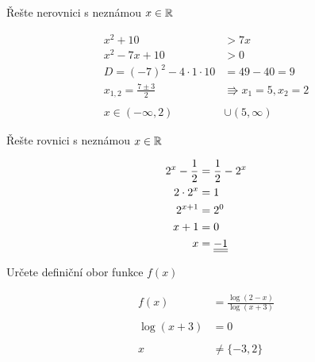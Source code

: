 \begin{example}
    Řešte nerovnici s neznámou $x \in \mathbb{R}$
\end{example}
\begin{align*}
    x^2+10 &> 7x
    \\
    x^2 -7x + 10 &> 0 \\
    D = (-7)^2 - 4\cdot1\cdot10 &= 49-40 = 9 \\
    x_{1,2} = \frac{7 \pm 3}{2} &\Rrightarrow x_1 = 5, x_2 = 2 \\\\
    x \in (-\infty, 2) &\cup (5, \infty) 
\end{align*}
\begin{example}
    Řešte rovnici s neznámou $x \in \mathbb{R}$
\end{example}
\begin{align*}
    2^x - \frac{1}{2} &= \frac{1}{2} - 2^x
    \\ 2 \cdot 2^x &= 1
    \\ 2^{x+1} &= 2^0
    \\ x+1 &= 0 
    \\ x &= \underline{\underline{-1}} 
\end{align*}
\begin{example}
    Určete definiční obor funkce $f(x)$
\end{example}
\begin{align*}
    f(x) &= \frac{\log{(2-x)}}{\log{(x+3)}}
    \\ \\ \log{(x+3)} &= 0  
    \\ \\ x &\neq \{-3,2\}
\end{align*}
\page

